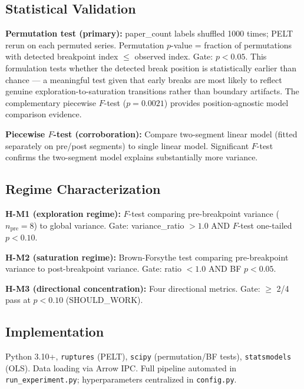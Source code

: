 \subsection{Statistical Validation}

\textbf{Permutation test (primary):} paper\_count labels shuffled 1000 times; PELT rerun on each permuted series. Permutation $p$-value = fraction of permutations with detected breakpoint index $\leq$ observed index. Gate: $p < 0.05$. This formulation tests whether the detected break position is statistically earlier than chance --- a meaningful test given that early breaks are most likely to reflect genuine exploration-to-saturation transitions rather than boundary artifacts. The complementary piecewise $F$-test ($p=0.0021$) provides position-agnostic model comparison evidence.

\textbf{Piecewise $F$-test (corroboration):} Compare two-segment linear model (fitted separately on pre/post segments) to single linear model. Significant $F$-test confirms the two-segment model explains substantially more variance.

\subsection{Regime Characterization}

\textbf{H-M1 (exploration regime):} $F$-test comparing pre-breakpoint variance ($n_{\text{pre}}=8$) to global variance. Gate: variance\_ratio $> 1.0$ AND $F$-test one-tailed $p < 0.10$.

\textbf{H-M2 (saturation regime):} Brown-Forsythe test comparing pre-breakpoint variance to post-breakpoint variance. Gate: ratio $< 1.0$ AND BF $p < 0.05$.

\textbf{H-M3 (directional concentration):} Four directional metrics. Gate: $\geq$ 2/4 pass at $p < 0.10$ (SHOULD\_WORK).

\subsection{Implementation}

Python 3.10+, \texttt{ruptures} (PELT), \texttt{scipy} (permutation/BF tests), \texttt{statsmodels} (OLS). Data loading via Arrow IPC. Full pipeline automated in \texttt{run\_experiment.py}; hyperparameters centralized in \texttt{config.py}.
